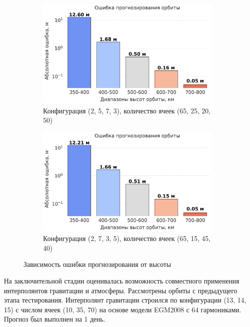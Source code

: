 \begin{figure}[htbp]
    \begin{subfigure}[b]{0.48\textwidth}
        \includegraphics[width=\linewidth]{../images/solution/atmo/propagation/2573.png}
        \caption{Конфигурация (2, 5, 7, 3),
        количество ячеек (65, 25, 20, 50)}
        \label{fig:atmo:2573_propag}
    \end{subfigure}
    \hfill
    \begin{subfigure}[b]{0.48\textwidth}
        \includegraphics[width=\linewidth]{../images/solution/atmo/propagation/2735.png}
        \caption{Конфигурация (2, 7, 3, 5),
        количество ячеек (65, 15, 45, 40)}
        \label{fig:atmo:2735_propag}
    \end{subfigure}
    \caption{Зависимость ошибки прогнозирования от высоты}
    \label{fig:all_images}
\end{figure}

На заключительной стадии оценивалась возможность совместного применения интерполянтов
гравитации и атмосферы. Рассмотрены орбиты с предыдущего этапа тестирования. 
Интерполянт гравитации строился по конфигурации (13, 14, 15) с числом ячеек (10, 35, 70)
на основе модели EGM2008 с 64 гармониками.
Прогноз был выполнен на 1 день. 

